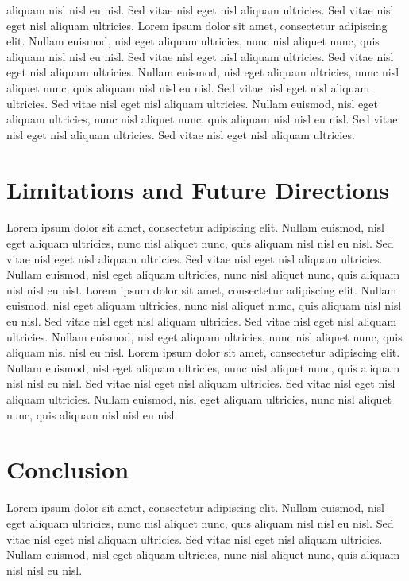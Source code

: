 \documentclass[
  jou,
  floatsintext,
  longtable,
  nolmodern,
  notxfonts,
  notimes,
  colorlinks=true,linkcolor=blue,citecolor=blue,urlcolor=blue]{apa7}
\begin{document}
aliquam nisl nisl eu nisl. Sed vitae nisl eget nisl aliquam ultricies.
Sed vitae nisl eget nisl aliquam ultricies. Lorem ipsum dolor sit amet,
consectetur adipiscing elit. Nullam euismod, nisl eget aliquam
ultricies, nunc nisl aliquet nunc, quis aliquam nisl nisl eu nisl. Sed
vitae nisl eget nisl aliquam ultricies. Sed vitae nisl eget nisl aliquam
ultricies. Nullam euismod, nisl eget aliquam ultricies, nunc nisl
aliquet nunc, quis aliquam nisl nisl eu nisl. Sed vitae nisl eget nisl
aliquam ultricies. Sed vitae nisl eget nisl aliquam ultricies. Nullam
euismod, nisl eget aliquam ultricies, nunc nisl aliquet nunc, quis
aliquam nisl nisl eu nisl. Sed vitae nisl eget nisl aliquam ultricies.
Sed vitae nisl eget nisl aliquam ultricies.

\section{Limitations and Future
Directions}\label{limitations-and-future-directions}

Lorem ipsum dolor sit amet, consectetur adipiscing elit. Nullam euismod,
nisl eget aliquam ultricies, nunc nisl aliquet nunc, quis aliquam nisl
nisl eu nisl. Sed vitae nisl eget nisl aliquam ultricies. Sed vitae nisl
eget nisl aliquam ultricies. Nullam euismod, nisl eget aliquam
ultricies, nunc nisl aliquet nunc, quis aliquam nisl nisl eu nisl. Lorem
ipsum dolor sit amet, consectetur adipiscing elit. Nullam euismod, nisl
eget aliquam ultricies, nunc nisl aliquet nunc, quis aliquam nisl nisl
eu nisl. Sed vitae nisl eget nisl aliquam ultricies. Sed vitae nisl eget
nisl aliquam ultricies. Nullam euismod, nisl eget aliquam ultricies,
nunc nisl aliquet nunc, quis aliquam nisl nisl eu nisl. Lorem ipsum
dolor sit amet, consectetur adipiscing elit. Nullam euismod, nisl eget
aliquam ultricies, nunc nisl aliquet nunc, quis aliquam nisl nisl eu
nisl. Sed vitae nisl eget nisl aliquam ultricies. Sed vitae nisl eget
nisl aliquam ultricies. Nullam euismod, nisl eget aliquam ultricies,
nunc nisl aliquet nunc, quis aliquam nisl nisl eu nisl.

\section{Conclusion}\label{conclusion}

Lorem ipsum dolor sit amet, consectetur adipiscing elit. Nullam euismod,
nisl eget aliquam ultricies, nunc nisl aliquet nunc, quis aliquam nisl
nisl eu nisl. Sed vitae nisl eget nisl aliquam ultricies. Sed vitae nisl
eget nisl aliquam ultricies. Nullam euismod, nisl eget aliquam
ultricies, nunc nisl aliquet nunc, quis aliquam nisl nisl eu nisl.
\end{document}
